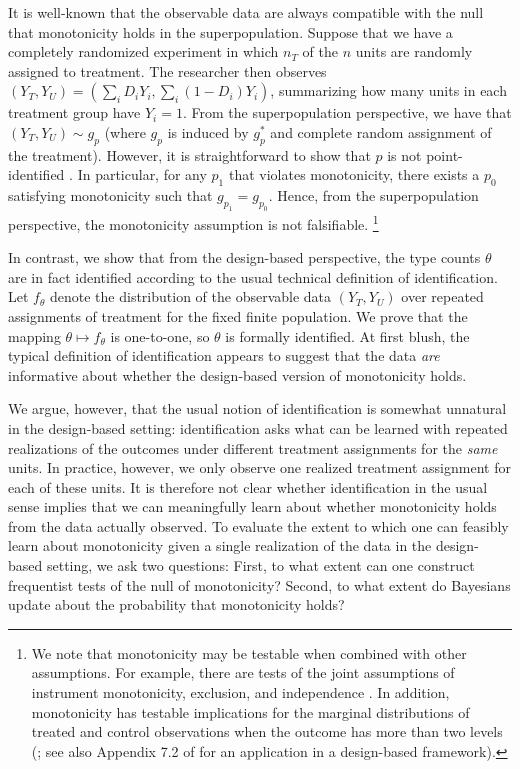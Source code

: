 \documentclass[12pt,reqno]{amsart}
\begin{document}
It is well-known that the observable data are always compatible with the null that monotonicity holds in the
superpopulation. Suppose that we have a completely randomized experiment in
which $n_T$ of the $n$ units are randomly assigned to treatment. The researcher then
observes $(Y_T,Y_U) = (\sum_i D_i Y_i, \sum_i (1-D_i) Y_i)$, summarizing how many units in
each treatment group have $Y_i=1$. From the superpopulation perspective,
we have that $(Y_T,Y_U) \sim g_p$ (where $g_p$ is induced by $g_p^*$ and complete random assignment of the treatment). However, it is straightforward to show that
$p$ is not point-identified \citep[see, e.g.,][]{heckman_making_1997, fan_sharp_2010}. In particular, for any $p_1$ that violates monotonicity,
there exists a $p_0$ satisfying monotonicity such that $g_{p_1} = g_{p_0}$. Hence, from
the superpopulation perspective, the monotonicity assumption is not falsifiable.%
\footnote{We note that monotonicity may be testable when combined with other assumptions. For example, there are tests of the joint assumptions of instrument monotonicity, exclusion, and independence \citep[e.g.][]{kitagawa_test_2015}.
In addition, monotonicity has testable implications for the marginal distributions of treated and control observations when the outcome has more than two levels (\citealp{angrist1995two}; see also Appendix 7.2 of \citealp{caughey2023randomisation} for an application in a design-based framework).
}

In contrast, we show that from the design-based perspective, the type counts $\theta$ are in fact identified according to the usual technical definition of identification. Let $f_\theta$ denote the distribution of the observable data $(Y_T,Y_U)$  over repeated assignments of treatment for the fixed finite population. We prove that the mapping $\theta \mapsto f_\theta$ is one-to-one, so $\theta$ is formally identified. At first blush, the typical definition of identification appears to suggest that the data \emph{are} informative about whether the design-based version of monotonicity holds. 

We argue, however, that the usual notion of identification is somewhat unnatural in the
design-based setting: identification asks what can be learned with repeated
realizations of the outcomes under different treatment assignments for the \emph{same}
units. In practice, however, we only observe one realized treatment assignment for each of
these units. It is therefore not clear whether identification in the usual sense implies
that we can meaningfully {learn} about whether monotonicity holds from the data actually observed. To evaluate the extent to which one can feasibly learn about
monotonicity given a single realization of the data in the design-based setting,
we ask two questions: First, to what extent can one construct frequentist tests of the
null of monotonicity? Second, to what extent do Bayesians update about the probability
that monotonicity holds?
\end{document}
